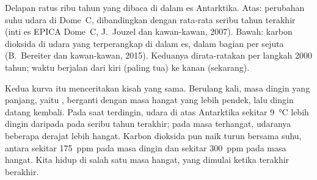 \begin{omfigure}

{\small Delapan ratus ribu tahun yang dibaca di dalam es Antarktika. Atas:
perubahan suhu udara di Dome~C, dibandingkan dengan rata-rata seribu tahun
terakhir (inti es EPICA Dome~C, J.~Jouzel dan kawan-kawan, 2007). Bawah:
karbon dioksida di udara yang terperangkap di dalam es, dalam bagian per
sejuta (B.~Bereiter dan kawan-kawan, 2015). Keduanya dirata-ratakan per
langkah \num{2000} tahun; waktu berjalan dari kiri (paling tua) ke kanan
(sekarang).}
\label{fig:g9:climate-past-and-present:icecore}
\end{omfigure}

Kedua kurva itu menceritakan kisah yang sama. Berulang kali, masa dingin
yang panjang, yaitu , berganti dengan masa hangat yang lebih
pendek, lalu dingin datang kembali. Pada saat terdingin, udara di atas
Antarktika sekitar \qty{9}{\degreeCelsius} lebih dingin daripada pada
seribu tahun terakhir; pada masa terhangat, udaranya beberapa derajat
lebih hangat. Karbon dioksida pun naik turun bersama suhu, antara sekitar
\qty{175}{ppm} pada masa dingin dan sekitar \qty{300}{ppm} pada masa
hangat. Kita hidup di salah satu masa hangat, yang dimulai ketika 
terakhir berakhir.

